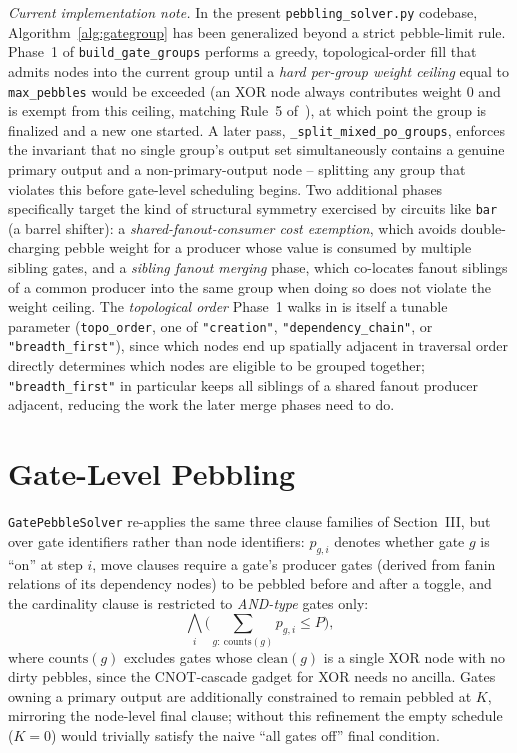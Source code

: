 \emph{Current implementation note.} In the present
\texttt{pebbling\_solver.py} codebase, Algorithm~\ref{alg:gategroup}
has been generalized beyond a strict pebble-limit rule. Phase~1 of
\texttt{build\_gate\_groups} performs a greedy, topological-order fill
that admits nodes into the current group until a \emph{hard
per-group weight ceiling} equal to \texttt{max\_pebbles} would be
exceeded (an XOR node always contributes weight $0$ and is exempt
from this ceiling, matching Rule~5 of~), at which
point the group is finalized and a new one started. A later pass,
\texttt{\_split\_mixed\_po\_groups}, enforces the invariant that no
single group's output set simultaneously contains a genuine primary
output and a non-primary-output node -- splitting any group that
violates this before gate-level scheduling begins. Two additional
phases specifically target the kind of structural symmetry exercised
by circuits like \texttt{bar} (a barrel shifter): a
\emph{shared-fanout-consumer cost exemption}, which avoids
double-charging pebble weight for a producer whose value is consumed
by multiple sibling gates, and a \emph{sibling fanout merging} phase,
which co-locates fanout siblings of a common producer into the same
group when doing so does not violate the weight ceiling. The
\emph{topological order} Phase~1 walks in is itself a tunable
parameter (\texttt{topo\_order}, one of \texttt{"creation"},
\texttt{"dependency\_chain"}, or \texttt{"breadth\_first"}), since
which nodes end up spatially adjacent in traversal order directly
determines which nodes are eligible to be grouped together;
\texttt{"breadth\_first"} in particular keeps all siblings of a shared
fanout producer adjacent, reducing the work the later merge phases
need to do.

\section{Gate-Level Pebbling}

\texttt{GatePebbleSolver} re-applies the same three clause families
of Section~III, but over gate identifiers rather than node
identifiers: $p_{g,i}$ denotes whether gate $g$ is ``on'' at step
$i$, move clauses require a gate's producer gates (derived from
$\mathrm{fanin}$ relations of its dependency nodes) to be pebbled
before and after a toggle, and the cardinality clause is restricted
to \emph{AND-type} gates only:
\begin{equation}
\bigwedge_{i}\Big(\sum_{g:\ \mathrm{counts}(g)} p_{g,i} \le P\Big),
\end{equation}
where $\mathrm{counts}(g)$ excludes gates whose $\mathrm{clean}(g)$
is a single XOR node with no dirty pebbles, since the CNOT-cascade
gadget for XOR needs no ancilla. Gates owning a primary output are
additionally constrained to remain pebbled at $K$, mirroring the
node-level final clause; without this refinement the empty schedule
($K=0$) would trivially satisfy the naive ``all gates off'' final
condition.

